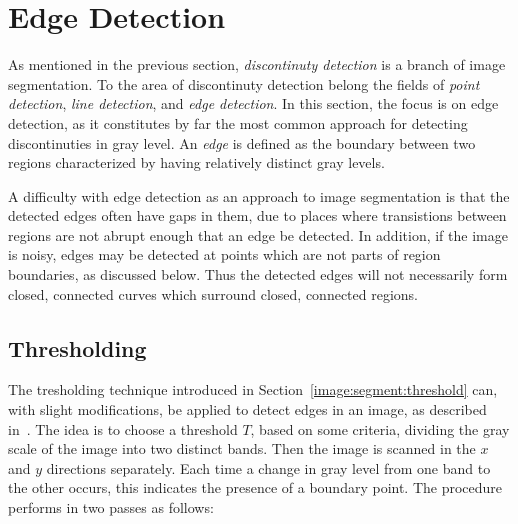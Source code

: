 
\section{Edge Detection}
\label{image:edge}

As mentioned in the previous section, {\em discontinuty detection\/}
is a branch of image segmentation.  To the area of discontinuty
detection belong the fields of {\em point detection\/}, {\em line
  detection\/}, and {\em edge detection\/}.  In this section, the
focus is on edge detection, as it constitutes by far the most common
approach for detecting discontinuties in gray level.  An {\em edge\/}
is defined as the boundary between two regions characterized by having
relatively distinct gray levels.

A difficulty with edge detection as an approach to image segmentation
is that the detected edges often have gaps in them, due to places
where transistions between regions are not abrupt enough that an edge
be detected.  In addition, if the image is noisy, edges may be
detected at points which are not parts of region boundaries, as
discussed below.  Thus the detected edges will not necessarily form
closed, connected curves which surround closed, connected regions.

\subsection{Thresholding}
\label{image:edge:threshold}

The tresholding technique introduced in
Section~\ref{image:segment:threshold} can, with slight modifications,
be applied to detect edges in an image, as described in~\cite{digim}.
The idea is to choose a threshold $T$, based on some criteria,
dividing the gray scale of the image into two distinct bands.  Then
the image is scanned in the $x$ and $y$ directions separately.  Each
time a change in gray level from one band to the other occurs, this
indicates the presence of a boundary point.  The procedure performs in
two passes as follows:


